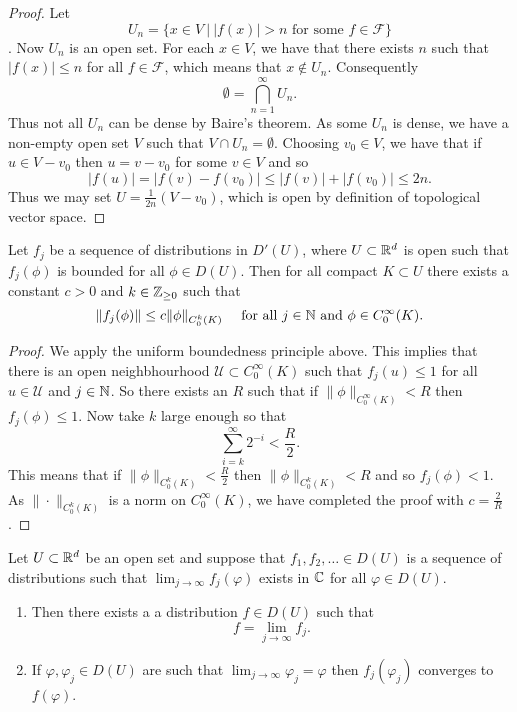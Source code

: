 \documentclass[twoside, a4paper, 10pt]{amsart}
\begin{document}
\begin{proof} Let $$U_n = \{ x \in V ~|~ |f(x)| > n \text{ for some } f \in \mathcal{F} \}$$. Now $U_n$ is an open set. For each $x \in V$, we have that there exists $n$ such that $|f(x)| \leq n$ for all $f \in \mathcal{F}$, which means that $x \notin U_n$. Consequently $$\emptyset = \bigcap_{n=1}^{\infty} U_n.$$ Thus not all $U_n$ can be dense by Baire's theorem. As some $U_n$ is dense, we have a non-empty open set $V$ such that $V \cap U_n = \emptyset$. Choosing $v_0 \in V$, we have that if $u \in V-v_0$ then $u = v-v_0$ for some $v \in V$ and so $$|f(u)| = |f(v) - f(v_0)| \leq |f(v)| + |f(v_0)| \leq 2n.$$ Thus we may set $U = \frac{1}{2n}(V-v_0)$, which is open by definition of topological vector space. \end{proof}

\begin{thm} Let $f_j$ be a sequence of distributions in $D'(U)$, where $U \subset \mathbb{R}^d$ is open such that $f_j(\phi)$ is bounded for all $\phi \in D(U)$. Then for all compact $K \subset U$ there exists a constant $c>0$ and $k \in \mathbb{Z}_{\geq 0}$ such that $$\|f_j(\phi)\| \leq c \| \phi \|_{C_0^k(K)} \quad \text{ for all } j \in \mathbb{N} \text{ and } \phi \in C_0^{\infty}(K).$$

\end{thm}

\begin{proof} We apply the uniform boundedness principle above. This implies that there is an open neighbhourhood $\mathcal{U} \subset C_0^{\infty}(K)$ such that $f_j(u) \leq 1$ for all $u \in \mathcal{U}$ and $j \in \mathbb{N}$. So there exists an $R$ such that if $\| \phi \|_{C_0^{\infty}(K)} < R$ then $f_j(\phi) \leq 1$. Now take $k$ large enough so that $$\sum_{i=k}^{\infty} 2^{-i} < \frac{R}{2}.$$ This means that if $\|\phi \|_{C_0^{k}(K)} < \frac{R}{2}$ then $\| \phi \|_{C_0^k(K)} < R$ and so $f_j(\phi) < 1$. As $\|\cdot \|_{C_0^k(K)}$ is a norm on $C_0^{\infty}(K)$, we have completed the proof with $c= \frac{2}{R}$.  \end{proof}

\begin{thm} Let $U \subset \mathbb{R}^d$ be an open set and suppose that $f_1,f_2, \ldots \in D(U)$ is a sequence of distributions such that $\lim_{j\to \infty} f_j(\varphi)$ exists in $\mathbb{C}$ for all $\varphi \in D(U)$. 
\begin{enumerate}
	\item Then there exists a a distribution $f \in D(U)$ such that $$f = \lim_{j \to \infty} f_j.$$
	\item If $\varphi, \varphi_j \in D(U)$ are such that $\lim_{j \to \infty} \varphi_j = \varphi$ then $f_j(\varphi_j)$ converges to $f(\varphi)$.
\end{enumerate}

\end{thm}
\end{document}
